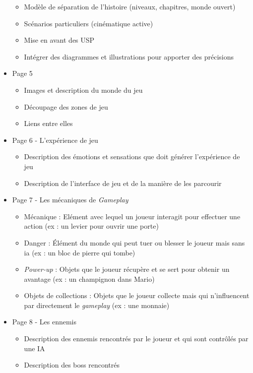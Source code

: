 \begin{itemize}
\begin{itemize}
        \item Modèle de séparation de l'histoire (niveaux, chapitres, monde ouvert)
        \item Scénarios particuliers (cinématique active)
        \item Mise en avant des USP
        \item Intégrer des diagrammes et illustrations pour apporter des précisions
    \end{itemize}
    \item Page 5
    \begin{itemize}
        \item Images et description du monde du jeu
        \item Découpage des zones de jeu
        \item Liens entre elles
    \end{itemize}
    \item Page 6 - L'expérience de jeu
    \begin{itemize}
        \item Description des émotions et sensations que doit générer l'expérience de jeu
        \item Description de l'interface de jeu et de la manière de les parcourir
    \end{itemize}
    \item Page 7 - Les mécaniques de \emph{Gameplay} 
    \begin{itemize}
        \item Mécanique : Elément avec lequel un joueur interagit pour effectuer une action (ex : un levier pour ouvrir une porte)
        \item Danger : Élément du monde qui peut tuer ou blesser le joueur mais sans \gls{ia} (ex : un bloc de pierre qui tombe)
        \item \emph{Power-up} : Objets que le joueur récupère et se sert pour obtenir un avantage (ex : un champignon dans Mario)
        \item Objets de collections : Objets que le joueur collecte mais qui n'influencent par directement le \emph{gameplay} (ex : une monnaie)
    \end{itemize}
    \item Page 8 - Les ennemis
    \begin{itemize}
        \item Description des ennemis rencontrés par le joueur et qui sont contrôlés par une IA
        \item Description des boss rencontrés

\end{itemize}
\end{itemize}
